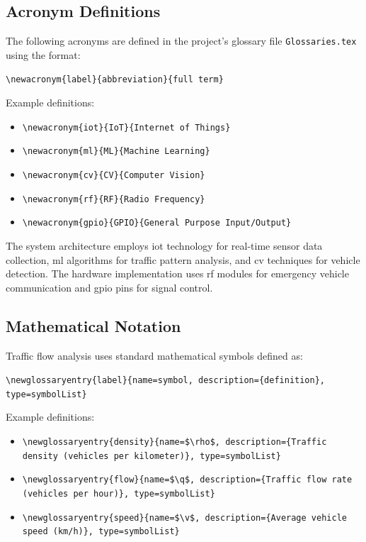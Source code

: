 \documentclass[12pt]{report}
\begin{document}
\subsection{Acronym Definitions}
The following acronyms are defined in the project's glossary file \texttt{Glossaries.tex} using the format:

\texttt{\textbackslash newacronym\{label\}\{abbreviation\}\{full term\}}

Example definitions:
\begin{itemize}
    \item \texttt{\textbackslash newacronym\{iot\}\{IoT\}\{Internet of Things\}}
    \item \texttt{\textbackslash newacronym\{ml\}\{ML\}\{Machine Learning\}}
    \item \texttt{\textbackslash newacronym\{cv\}\{CV\}\{Computer Vision\}}
    \item \texttt{\textbackslash newacronym\{rf\}\{RF\}\{Radio Frequency\}}
    \item \texttt{\textbackslash newacronym\{gpio\}\{GPIO\}\{General Purpose Input/Output\}}
\end{itemize}

The system architecture employs \gls{iot} technology for real-time sensor data collection, \gls{ml} algorithms for traffic pattern analysis, and \gls{cv} techniques for vehicle detection. The hardware implementation uses \gls{rf} modules for emergency vehicle communication and \gls{gpio} pins for signal control.

\subsection{Mathematical Notation}

Traffic flow analysis uses standard mathematical symbols defined as:

\texttt{\textbackslash newglossaryentry\{label\}\{name=symbol, description=\{definition\}, type=symbolList\}}

Example definitions:
\begin{itemize}
    \item \texttt{\textbackslash newglossaryentry\{density\}\{name=\$\textbackslash rho\$, description=\{Traffic density (vehicles per kilometer)\}, type=symbolList\}}
    \item \texttt{\textbackslash newglossaryentry\{flow\}\{name=\$\textbackslash q\$, description=\{Traffic flow rate (vehicles per hour)\}, type=symbolList\}}
    \item \texttt{\textbackslash newglossaryentry\{speed\}\{name=\$\textbackslash v\$, description=\{Average vehicle speed (km/h)\}, type=symbolList\}}
\end{itemize}
\end{document}
